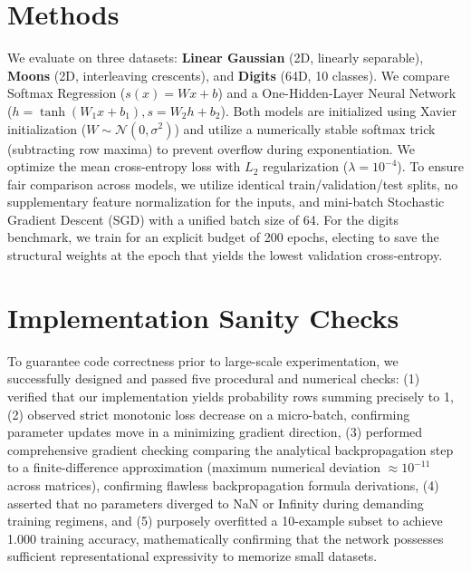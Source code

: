 \documentclass[11pt]{article}
\begin{document}
\section{Methods}

We evaluate on three datasets: \textbf{Linear Gaussian} (2D, linearly separable), \textbf{Moons} (2D, interleaving crescents), and \textbf{Digits} (64D, 10 classes). We compare Softmax Regression ($s(x) = Wx + b$) and a One-Hidden-Layer Neural Network ($h = \tanh(W_1x + b_1), s = W_2h + b_2$). Both models are initialized using Xavier initialization ($W \sim \mathcal{N}(0, \sigma^2)$) and utilize a numerically stable softmax trick (subtracting row maxima) to prevent overflow during exponentiation. We optimize the mean cross-entropy loss with $L_2$ regularization ($\lambda = 10^{-4}$). To ensure fair comparison across models, we utilize identical train/validation/test splits, no supplementary feature normalization for the inputs, and mini-batch Stochastic Gradient Descent (SGD) with a unified batch size of 64. For the digits benchmark, we train for an explicit budget of 200 epochs, electing to save the structural weights at the epoch that yields the lowest validation cross-entropy.


\section{Implementation Sanity Checks}

To guarantee code correctness prior to large-scale experimentation, we successfully designed and passed five procedural and numerical checks: (1) verified that our implementation yields probability rows summing precisely to 1, (2) observed strict monotonic loss decrease on a micro-batch, confirming parameter updates move in a minimizing gradient direction, (3) performed comprehensive gradient checking comparing the analytical backpropagation step to a finite-difference approximation (maximum numerical deviation $\approx 10^{-11}$ across matrices), confirming flawless backpropagation formula derivations, (4) asserted that no parameters diverged to NaN or Infinity during demanding training regimens, and (5) purposely overfitted a 10-example subset to achieve 1.000 training accuracy, mathematically confirming that the network possesses sufficient representational expressivity to memorize small datasets.
\end{document}
